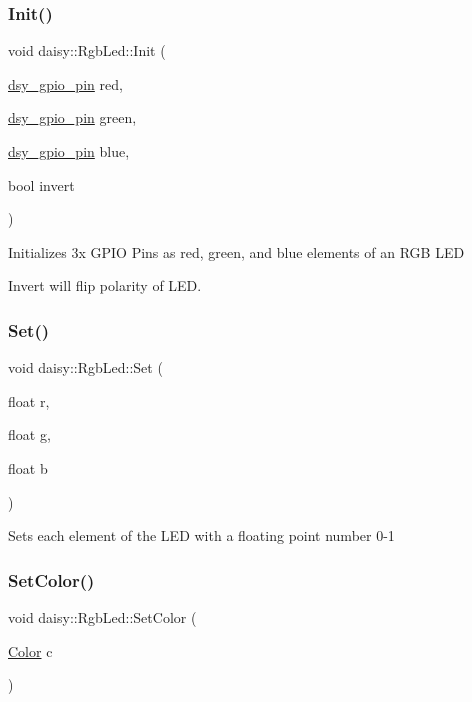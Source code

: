 \subsubsection{\texorpdfstring{Init()}{Init()}}
{\footnotesize\ttfamily void daisy\+::\+Rgb\+Led\+::\+Init (\begin{DoxyParamCaption}\item[{\hyperlink{structdsy__gpio__pin}{dsy\+\_\+gpio\+\_\+pin}}]{red,  }\item[{\hyperlink{structdsy__gpio__pin}{dsy\+\_\+gpio\+\_\+pin}}]{green,  }\item[{\hyperlink{structdsy__gpio__pin}{dsy\+\_\+gpio\+\_\+pin}}]{blue,  }\item[{bool}]{invert }\end{DoxyParamCaption})}

Initializes 3x G\+P\+IO Pins as red, green, and blue elements of an R\+GB L\+ED

Invert will flip polarity of L\+ED. \mbox{\label{classdaisy_1_1_rgb_led_a342c072e678f5df25a8f638a91479d1f}} 
\subsubsection{\texorpdfstring{Set()}{Set()}}
{\footnotesize\ttfamily void daisy\+::\+Rgb\+Led\+::\+Set (\begin{DoxyParamCaption}\item[{float}]{r,  }\item[{float}]{g,  }\item[{float}]{b }\end{DoxyParamCaption})}

Sets each element of the L\+ED with a floating point number 0-\/1 \mbox{\label{classdaisy_1_1_rgb_led_afc530391dc068788952edbe9907df8e9}} 
\subsubsection{\texorpdfstring{Set\+Color()}{SetColor()}}
{\footnotesize\ttfamily void daisy\+::\+Rgb\+Led\+::\+Set\+Color (\begin{DoxyParamCaption}\item[{\hyperlink{classdaisy_1_1_color}{Color}}]{c }\end{DoxyParamCaption})}

